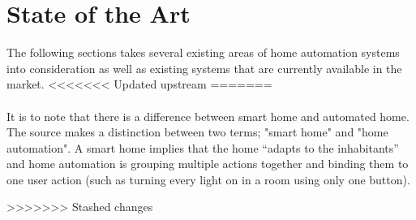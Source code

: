 \section{State of the Art}\label{sec:sota}
The following sections takes several existing areas of home automation systems into consideration as well as existing systems that are currently available in the market.
<<<<<<< Updated upstream
=======
\\\\
It is to note that there is a difference between smart home and automated home. The source \cite{HAInterviews} makes a distinction between two terms; "smart home" and "home automation". A smart home implies that the home \enquote{adapts to the inhabitants}\cite{HAInterviews} and home automation is grouping multiple actions together and binding them to one user action (such as turning every light on in a room using only one button).

>>>>>>> Stashed changes



